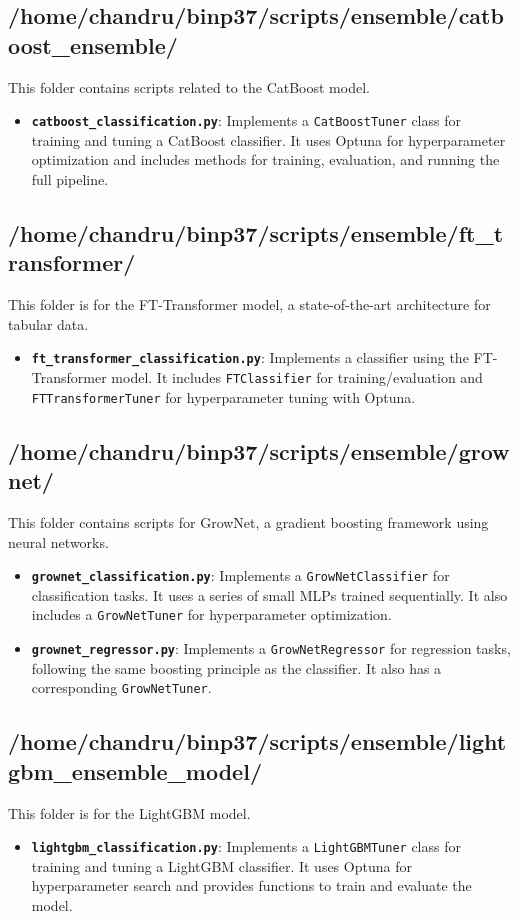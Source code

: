\documentclass{article}
\begin{document}
\subsection*{/home/chandru/binp37/scripts/ensemble/catboost\_ensemble/}
This folder contains scripts related to the CatBoost model.
\begin{itemize}
    \item \textbf{\texttt{catboost\_classification.py}}: Implements a \texttt{CatBoostTuner} class for training and tuning a CatBoost classifier. It uses Optuna for hyperparameter optimization and includes methods for training, evaluation, and running the full pipeline.
\end{itemize}

\subsection*{/home/chandru/binp37/scripts/ensemble/ft\_transformer/}
This folder is for the FT-Transformer model, a state-of-the-art architecture for tabular data.
\begin{itemize}
    \item \textbf{\texttt{ft\_transformer\_classification.py}}: Implements a classifier using the FT-Transformer model. It includes \texttt{FTClassifier} for training/evaluation and \texttt{FTTransformerTuner} for hyperparameter tuning with Optuna.
\end{itemize}

\subsection*{/home/chandru/binp37/scripts/ensemble/grownet/}
This folder contains scripts for GrowNet, a gradient boosting framework using neural networks.
\begin{itemize}
    \item \textbf{\texttt{grownet\_classification.py}}: Implements a \texttt{GrowNetClassifier} for classification tasks. It uses a series of small MLPs trained sequentially. It also includes a \texttt{GrowNetTuner} for hyperparameter optimization.
    \item \textbf{\texttt{grownet\_regressor.py}}: Implements a \texttt{GrowNetRegressor} for regression tasks, following the same boosting principle as the classifier. It also has a corresponding \texttt{GrowNetTuner}.
\end{itemize}

\subsection*{/home/chandru/binp37/scripts/ensemble/lightgbm\_ensemble\_model/}
This folder is for the LightGBM model.
\begin{itemize}
    \item \textbf{\texttt{lightgbm\_classification.py}}: Implements a \texttt{LightGBMTuner} class for training and tuning a LightGBM classifier. It uses Optuna for hyperparameter search and provides functions to train and evaluate the model.
\end{itemize}
\end{document}
